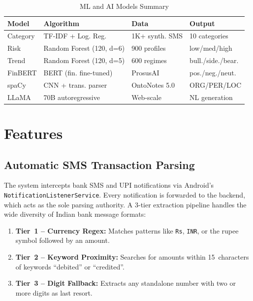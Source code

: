\documentclass[conference]{IEEEtran}
\begin{document}
\begin{table}[!t]
\centering
\caption{ML and AI Models Summary}
\label{tab:models}
\renewcommand{\arraystretch}{1.15}
\footnotesize
\begin{tabular}{p{1.2cm} p{2.6cm} p{1.4cm} p{1.8cm}}
\toprule
\textbf{Model} & \textbf{Algorithm} & \textbf{Data} & \textbf{Output} \\
\midrule
Category  & TF-IDF + Log. Reg.            & 1K+ synth. SMS     & 10 categories \\
Risk      & Random Forest (120, d=6)      & 900 profiles       & low/med/high \\
Trend     & Random Forest (120, d=5)      & 600 regimes        & bull./side./bear. \\
FinBERT   & BERT (fin. fine-tuned)        & ProsusAI           & pos./neg./neut. \\
spaCy     & CNN + trans. parser           & OntoNotes 5.0      & ORG/PER/LOC \\
LLaMA     & 70B autoregressive            & Web-scale          & NL generation \\
\bottomrule
\end{tabular}
\end{table}

\section{Features}

\subsection{Automatic SMS Transaction Parsing}

The system intercepts bank SMS and UPI notifications via Android's \texttt{NotificationListenerService}. Every notification is forwarded to the backend, which acts as the sole parsing authority. A 3-tier extraction pipeline handles the wide diversity of Indian bank message formats:

\begin{enumerate}
  \item \textbf{Tier~1 -- Currency Regex:} Matches patterns like \texttt{Rs}, \texttt{INR}, or the rupee symbol followed by an amount.
  \item \textbf{Tier~2 -- Keyword Proximity:} Searches for amounts within 15~characters of keywords ``debited'' or ``credited''.
  \item \textbf{Tier~3 -- Digit Fallback:} Extracts any standalone number with two or more digits as last resort.
\end{enumerate}
\end{document}
